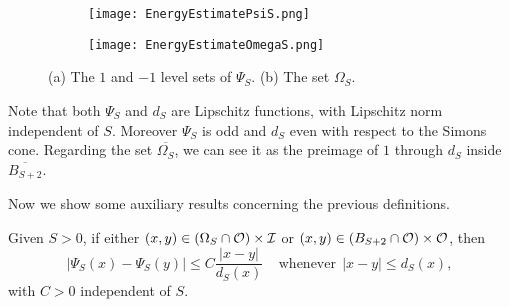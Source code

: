 \begin{figure}
	\centering
	\begin{subfigure}{0.49\textwidth}
		\centering
		\texttt{[image: EnergyEstimatePsiS.png]}
	\end{subfigure}
	\begin{subfigure}{0.49\textwidth}
		\centering
		\texttt{[image: EnergyEstimateOmegaS.png]}
	\end{subfigure}
	\caption{(a) The $1$ and $-1$ level sets of $\Psi_S$. (b) The set $\Omega_S$.}
	\label{Fig:PsiSandOmegaS}
\end{figure}

Note that both $\Psi_S$ and $d_S$ are Lipschitz functions, with Lipschitz norm independent of
$S$. Moreover $\Psi_S$ is odd and $d_S$ even with respect to the Simons cone. Regarding the set $\overline{\Omega_S}$, we can see it as the preimage of $1$ through $d_S$ inside $\overline{B_{S+2}}$.

Now we show some auxiliary results concerning the previous definitions.

\begin{lemma}
\label{Lemma: AdaptedLipschitzConditionWith_dFunction}
Given $S>0$, if either $(x,y) \in \left(\Omega_S\cap \mathcal{O}\right) \times \mathcal{I}$ or $(x,y)\in \left(B_{S+2}\cap \mathcal{O}\right) \times \mathcal{O}$, then
$$ |\Psi_S(x) - \Psi_S(y)| \leq C \frac{|x-y|}{d_S(x)} \ \ \ \ \ \textrm{whenever} \ \ |x-y|\leq d_S(x), $$
with $C>0$ independent of $S$.
\end{lemma}

